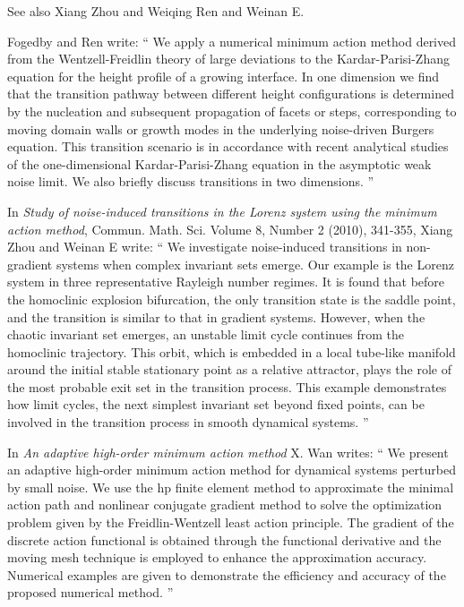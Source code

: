 \begin{description}
See also Xiang Zhou and  Weiqing Ren and Weinan E.

Fogedby and Ren write: ``
We apply a numerical minimum action method derived from the
Wentzell-Freidlin theory of large deviations to the Kardar-Parisi-Zhang
equation for the height profile of a growing interface. In one dimension
we find that the transition pathway between different height
configurations is determined by the nucleation and subsequent propagation
of facets or steps, corresponding to moving domain walls or growth modes
in the underlying noise-driven Burgers equation. This transition scenario
is in accordance with recent analytical studies of the one-dimensional
Kardar-Parisi-Zhang equation in the asymptotic weak noise limit. We also
briefly discuss transitions in two dimensions.
''

In {\em Study of noise-induced transitions in the Lorenz system using the
minimum action method},
Commun. Math. Sci. Volume 8, Number 2 (2010), 341-355,
Xiang Zhou and Weinan E write: ``
We investigate noise-induced transitions in non-gradient systems when
complex invariant sets emerge. Our example is the Lorenz system in three
representative Rayleigh number regimes. It is found that before the
homoclinic explosion bifurcation, the only transition state is the saddle
point, and the transition is similar to that in gradient systems.
However, when the chaotic invariant set emerges, an unstable limit cycle
continues from the homoclinic trajectory. This orbit, which is embedded
in a local tube-like manifold around the initial stable stationary point
as a relative attractor, plays the role of the most probable exit set in
the transition process. This example demonstrates how limit cycles, the
next simplest invariant set beyond fixed points, can be involved in the
transition process in smooth dynamical systems.
''

In {\em An adaptive high-order minimum action method}
X. Wan writes: ``
We present an adaptive high-order minimum
action method for dynamical systems perturbed by small noise. We use the
hp finite element method to approximate the minimal action path and
nonlinear conjugate gradient method to solve the optimization problem
given by the Freidlin-Wentzell least action principle. The gradient of
the discrete action functional is obtained through the functional
derivative and the moving mesh technique is employed to enhance the
approximation accuracy. Numerical examples are given to demonstrate the
efficiency and accuracy of the proposed numerical method.
''


\end{description}
